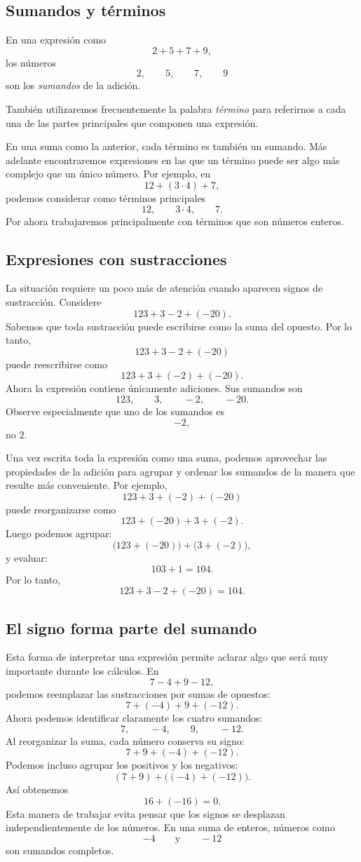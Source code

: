 \subsection{Sumandos y términos}

En una expresión como
\[
2+5+7+9,
\]
los números
\[
2,\qquad5,\qquad7,\qquad9
\]
son los \emph{sumandos} de la adición.

También utilizaremos frecuentemente la palabra \emph{término} para referirnos a cada una de las partes principales que componen una expresión.

En una suma como la anterior, cada término es también un sumando. Más adelante encontraremos expresiones en las que un término puede ser algo más complejo que un único número.
Por ejemplo, en
\[
12+(3\cdot 4)+7,
\]
podemos considerar como términos principales
\[
12,\qquad 3\cdot4,\qquad7.
\]
Por ahora trabajaremos principalmente con términos que son números enteros.

\subsection{Expresiones con sustracciones}

La situación requiere un poco más de atención cuando aparecen signos de sustracción.
Considere
\[
123+3-2+(-20).
\]
Sabemos que toda sustracción puede escribirse como la suma del opuesto. Por lo tanto,
\[
123+3-2+(-20)
\]
puede reescribirse como
\[
123+3+(-2)+(-20).
\]
Ahora la expresión contiene únicamente adiciones.
Sus sumandos son
\[
123,\qquad3,\qquad-2,\qquad-20.
\]
Observe especialmente que uno de los sumandos es
\[
-2,
\]
no \(2\).

Una vez escrita toda la expresión como una suma, podemos aprovechar las propiedades de la adición para agrupar y ordenar los sumandos de la manera que resulte más conveniente.
Por ejemplo,
\[
123+3+(-2)+(-20)
\]
puede reorganizarse como
\[
123+(-20)+3+(-2).
\]
Luego podemos agrupar:
\[
\bigl(123+(-20)\bigr)+\bigl(3+(-2)\bigr),
\]
y evaluar:
\[
103+1=104.
\]
Por lo tanto,
\[
123+3-2+(-20)=104.
\]

\subsection{El signo forma parte del sumando}

Esta forma de interpretar una expresión permite aclarar algo que será muy importante durante los cálculos.
En
\[
7-4+9-12,
\]
podemos reemplazar las sustracciones por sumas de opuestos:
\[
7+(-4)+9+(-12).
\]
Ahora podemos identificar claramente los cuatro sumandos:
\[
7,\qquad-4,\qquad9,\qquad-12.
\]
Al reorganizar la suma, cada número conserva su signo:
\[
7+9+(-4)+(-12).
\]
Podemos incluso agrupar los positivos y los negativos:
\[
(7+9)+\bigl((-4)+(-12)\bigr).
\]
Así obtenemos
\[
16+(-16)=0.
\]
Esta manera de trabajar evita pensar que los signos se desplazan independientemente de los números. En una suma de enteros, números como
\[
-4
\qquad\text{y}\qquad
-12
\]
son sumandos completos.

